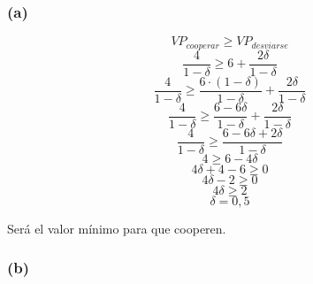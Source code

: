 \documentclass{article}
\begin{document}
            \subsubsection*{(a)}
                \[VP_{cooperar} \geq VP_{desviarse}\]
                \[\frac{4}{1-\delta} \geq 6 + \frac{2 \delta}{1 - \delta}\]
                \[\frac{4}{1-\delta} \geq \frac{6 \cdot (1 - \delta)}{1 - \delta} + \frac{2 \delta}{1 - \delta}\]
                \[\frac{4}{1-\delta} \geq \frac{6 - 6 \delta}{1 - \delta} + \frac{2 \delta}{1 - \delta}\]
                \[\frac{4}{1-\delta} \geq \frac{6 - 6 \delta + 2 \delta}{1 - \delta}\]
                \[4 \geq 6 - 4 \delta\]
                \[4 \delta + 4 - 6 \geq 0\]
                \[4 \delta - 2 \geq 0\]
                \[4 \delta \geq 2\]
                \[\delta = 0,5\]

                Será el valor mínimo para que cooperen.
            \subsubsection*{(b)}
                
\end{document}
